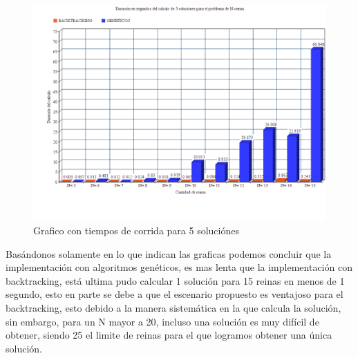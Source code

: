 \documentclass[12pt,a4paper]{article}
\begin{document}
\begin{figure}[htp]
\centering
\graphicspath{ {imagenes/} }
\includegraphics[scale=0.60]{analisis5.png}
\caption{Grafico con tiempos de corrida para 5 soluciónes}
\label{foto}
\end{figure}

Basándonos solamente en lo que indican las graficas podemos concluir que la implementación con algoritmos genéticos, es mas lenta que la implementación con backtracking, está ultima pudo calcular 1 solución para 15 reinas en menos de 1 segundo, esto en parte se debe a que el escenario propuesto es ventajoso para el backtracking, esto debido a la manera sistemática en la que calcula la solución, sin embargo, para un N mayor a 20, incluso una solución es muy difícil de obtener, siendo 25 el limite de reinas para el que logramos obtener una única solución.
\end{document}
